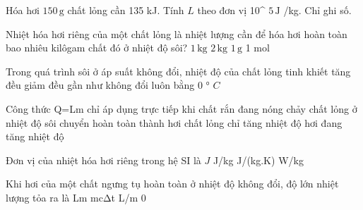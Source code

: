 \begin{ex}
Hóa hơi $150\,\text{g}$ chất lỏng cần 135 kJ. Tính $L$ theo đơn vị 10^ $5\,\text{J}$ /kg. Chỉ ghi số.
\end{ex}

\begin{ex}
Nhiệt hóa hơi riêng của một chất lỏng là nhiệt lượng cần để hóa hơi hoàn toàn bao nhiêu kilôgam chất đó ở nhiệt độ sôi?
\choice
{\True $1\,\text{kg}$}
{$2\,\text{kg}$}
{$1\,\text{g}$}
{1 mol}
\end{ex}

\begin{ex}
Trong quá trình sôi ở áp suất không đổi, nhiệt độ của chất lỏng tinh khiết
\choice
{tăng đều}
{giảm đều}
{\True gần như không đổi}
{luôn bằng 0 ° $C$}
\end{ex}

\begin{ex}
Công thức Q=Lm chỉ áp dụng trực tiếp khi
\choice
{chất rắn đang nóng chảy}
{\True chất lỏng ở nhiệt độ sôi chuyển hoàn toàn thành hơi}
{chất lỏng chỉ tăng nhiệt độ}
{hơi đang tăng nhiệt độ}
\end{ex}

\begin{ex}
Đơn vị của nhiệt hóa hơi riêng trong hệ SI là
\choice
{$J$}
{\True J/kg}
{J/(kg.K)}
{W/kg}
\end{ex}

\begin{ex}
Khi hơi của một chất ngưng tụ hoàn toàn ở nhiệt độ không đổi, độ lớn nhiệt lượng tỏa ra là
\choice
{\True Lm}
{mcΔt}
{L/m}
{0}
\end{ex}

